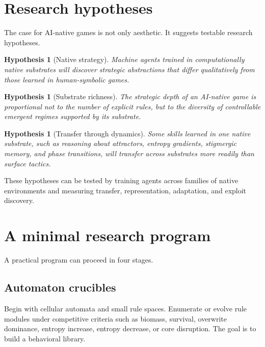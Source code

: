\documentclass[11pt,a4paper]{article}
\theoremstyle{plain}
\newtheorem{hypothesis}[theorem]{Hypothesis}
\theoremstyle{definition}
\begin{document}
\section{Research hypotheses}\label{sec:hypotheses}

The case for AI-native games is not only aesthetic. It suggests testable research hypotheses.

\begin{hypothesis}[Native strategy]\label{hyp:native-strategy}
Machine agents trained in computationally native substrates will discover strategic abstractions that differ qualitatively from those learned in human-symbolic games.
\end{hypothesis}

\begin{hypothesis}[Substrate richness]\label{hyp:substrate-richness}
The strategic depth of an AI-native game is proportional not to the number of explicit rules, but to the diversity of controllable emergent regimes supported by its substrate.
\end{hypothesis}

\begin{hypothesis}[Transfer through dynamics]\label{hyp:transfer}
Some skills learned in one native substrate, such as reasoning about attractors, entropy gradients, stigmergic memory, and phase transitions, will transfer across substrates more readily than surface tactics.
\end{hypothesis}

These hypotheses can be tested by training agents across families of native environments and measuring transfer, representation, adaptation, and exploit discovery.

\section{A minimal research program}\label{sec:program}

A practical program can proceed in four stages.

\subsection{Automaton crucibles}

Begin with cellular automata and small rule spaces. Enumerate or evolve rule modules under competitive criteria such as biomass, survival, overwrite dominance, entropy increase, entropy decrease, or core disruption. The goal is to build a behavioral library.
\end{document}
